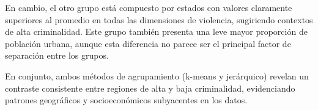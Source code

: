 \documentclass[
  spanish,
  11pt,
  a4paper,
  DIV=11,
  numbers=noendperiod]{scrartcl}
\begin{document}
En cambio, el otro grupo está compuesto por estados con valores
claramente superiores al promedio en todas las dimensiones de violencia,
sugiriendo contextos de alta criminalidad. Este grupo también presenta
una leve mayor proporción de población urbana, aunque esta diferencia no
parece ser el principal factor de separación entre los grupos.

En conjunto, ambos métodos de agrupamiento (k-means y jerárquico)
revelan un contraste consistente entre regiones de alta y baja
criminalidad, evidenciando patrones geográficos y socioeconómicos
subyacentes en los datos.
\end{document}

